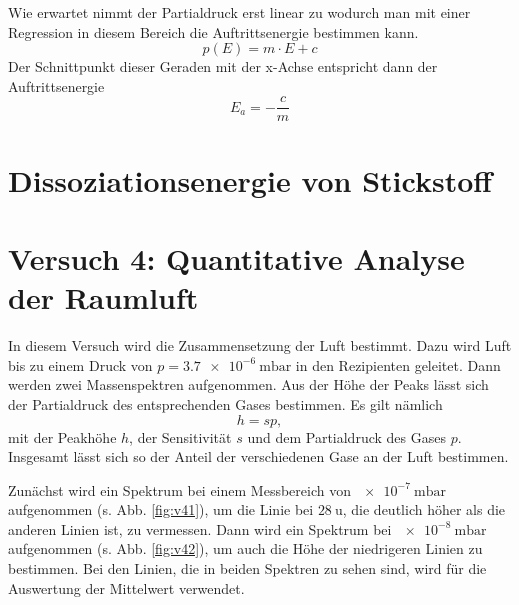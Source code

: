 
Wie erwartet nimmt der Partialdruck erst linear zu wodurch man mit einer Regression in diesem Bereich die Auftrittsenergie bestimmen kann.
\begin{equation}
	p(E) = m\cdot E + c
\end{equation}
Der Schnittpunkt dieser Geraden mit der x-Achse entspricht dann der Auftrittsenergie
\begin{equation}
	E_a = -\frac{c}{m}
\end{equation}


\section{Dissoziationsenergie von Stickstoff}



\section{Versuch 4: Quantitative Analyse der Raumluft}

In diesem Versuch wird die Zusammensetzung der Luft bestimmt. Dazu wird Luft bis zu einem Druck von $p=\SI{3,7e-6}{\milli\bar}$ in den Rezipienten geleitet. Dann werden zwei Massenspektren aufgenommen. Aus der Höhe der Peaks lässt sich der Partialdruck des entsprechenden Gases bestimmen. Es gilt nämlich
\begin{equation}
 h = sp,
\end{equation}
mit der Peakhöhe $h$, der Sensitivität $s$ und dem Partialdruck des Gases $p$. Insgesamt lässt sich so der Anteil der verschiedenen Gase an der Luft bestimmen.

Zunächst wird ein Spektrum bei einem Messbereich von $\SI{e-7}{\milli\bar}$ aufgenommen (s. Abb. \ref{fig:v41}), um die Linie bei $\SI{28}{\amu}$, die deutlich höher als die anderen Linien ist, zu vermessen. Dann wird ein Spektrum bei $\SI{e-8}{\milli\bar}$ aufgenommen (s. Abb. \ref{fig:v42}), um auch die Höhe der niedrigeren Linien zu bestimmen.
Bei den Linien, die in beiden Spektren zu sehen sind, wird für die Auswertung der Mittelwert verwendet.

